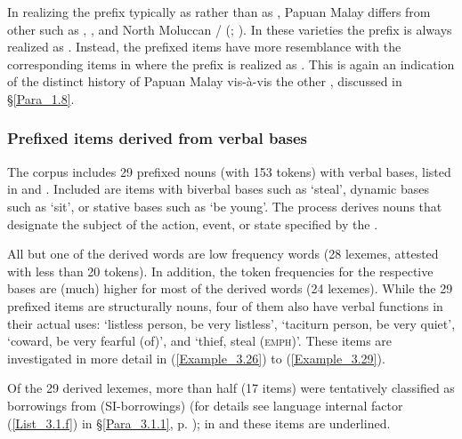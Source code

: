 In realizing the prefix typically as \textitbf{)}\textitbf{-} rather than as \textitbf{)}\textitbf{-}, Papuan Malay differs from other  such as  \citep[109]{vanMinde.1997},  \citep[23]{Stoel.2005}, and North Moluccan /  (\citealt[4]{Voorhoeve.1983}; \citealt[30]{Litamahuputty.2012}). In these varieties the prefix is always realized as \textitbf{)}\textitbf{-}. Instead, the prefixed items have more resemblance with the corresponding items in  where the prefix is realized as \textitbf{)}\textitbf{-}. This is again an indication of the distinct history of Papuan Malay vis-à-vis the other , discussed in §\ref{Para_1.8}.


\subsubsection[Prefixed items derived from verbal bases]{Prefixed items derived from verbal bases}\label{Para_3.1.4.2}

The corpus includes 29  prefixed nouns (with 153 tokens) with verbal bases, listed in   and . Included are items with biverbal bases such as  ‘steal’,  dynamic bases such as  ‘sit’, or  stative bases such as  ‘be young’. The  process derives nouns that designate the subject of the action, event, or state specified by the .



All but one of the derived words are low frequency words (28 lexemes, attested with less than 20 tokens). In addition, the token frequencies for the respective bases are (much) higher for most of the derived words (24 lexemes). While the 29 prefixed items are structurally nouns, four of them also have verbal functions in their actual uses:  ‘listless person, be very listless’,  ‘taciturn person, be very quiet’,  ‘coward, be very fearful (of)’, and  ‘thief, steal (\textsc{emph})’. These items are investigated in more detail in (\ref{Example_3.26}) to (\ref{Example_3.29}).



Of the 29 derived lexemes, more than half (17 items) were tentatively classified as borrowings from  (SI-borrowings) (for details see language internal factor (\ref{List_3.1.f}) in §\ref{Para_3.1.1}, p. \pageref{List_3.1.f}); in  and  these items are underlined.

